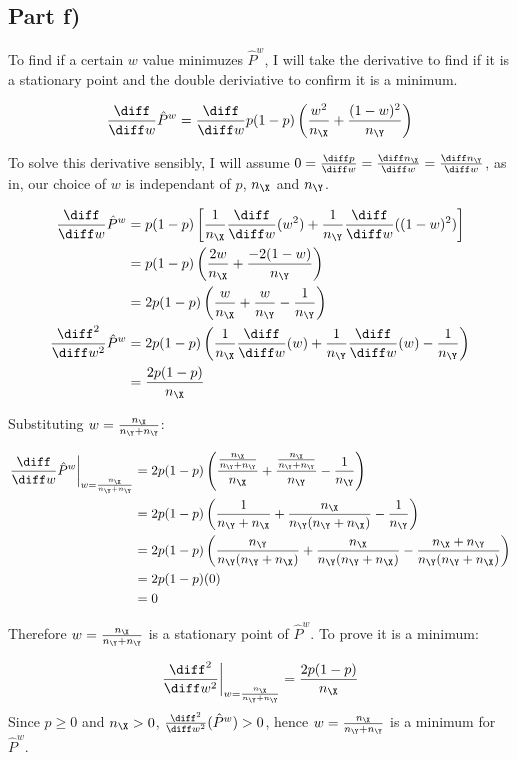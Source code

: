 \subsection{Part f)}
To find if a certain $w$ value minimuzes $\hat{P}^w$, I will take the derivative to find if it is a stationary point and the double deriviative
to confirm it is a minimum.

\[
\frac{\diff}{\diff w} \hat{P}^w = \frac{\diff}{\diff w} p(1-p)\left( \frac{w^2}{n_\X} + \frac{(1-w)^2}{n_\Y} \right)
\]

To solve this derivative sensibly, I will assume $0 = \frac{\diff p}{\diff w} = \frac{\diff n_\X}{\diff w} = \frac{\diff n_\Y}{\diff w}$,
as in, our choice of $w$ is independant of $p$, $n_\X$ and $n_\Y$.

\begin{align*}
\frac{\diff}{\diff w} \hat{P}^w &= p(1-p)\left[ \frac{1}{n_\X} \frac{\diff}{\diff w}(w^2) + \frac{1}{n_\Y} \frac{\diff}{\diff w}((1-w)^2) \right] \\
&= p(1-p) \left( \frac{2w}{n_\X} + \frac{-2(1-w)}{n_\Y} \right) \\
&= 2p(1-p) \left( \frac{w}{n_\X} + \frac{w}{n_\Y} - \frac{1}{n_\Y} \right) \\
\frac{\diff^2}{\diff w^2} \hat{P}^w &= 2p(1-p)\left( \frac{1}{n_\X} \frac{\diff}{\diff w}(w) + \frac{1}{n_\Y}\frac{\diff}{\diff w}(w) - \frac{1}{n_\Y} \right) \\
&= \frac{2p(1 - p)}{n_\X}
\end{align*}

Substituting $w = \frac{n_\X}{n_\Y + n_\Y}$:

\begin{align*}
\left. \frac{\diff}{\diff w} \hat{P}^w \right| _{w = \frac{n_\X}{n_\Y + n_\Y}} &= 2p(1-p)\left(
\frac{\frac{n_\X}{n_\Y + n_\Y}}{n_\X} + \frac{\frac{n_\X}{n_\Y + n_\Y}}{n_\Y} - \frac{1}{n_\Y} \right) \\
&= 2p(1-p)\left( \frac{1}{n_\Y + n_\X} + \frac{n_\X}{n_\Y(n_\Y + n_\X)} - \frac{1}{n_\Y} \right) \\
&= 2p(1-p)\left( \frac{n_\Y}{n_\Y(n_\Y + n_\X)} + \frac{n_\X}{n_\Y(n_\Y + n_\X)} - \frac{n_\X + n_\Y}{n_\Y(n_\Y + n_\X)} \right) \\
&= 2p(1-p)(0) \\
&= 0
\end{align*}

Therefore $w = \frac{n_\X}{n_\Y + n_\Y}$ is a stationary point of $\hat{P}^w$. To prove it is a minimum:

\[
\left. \frac{\diff^2}{\diff w^2} \right| _{w = \frac{n_\X}{n_\Y + n_\Y}} = \frac{2p(1 - p)}{n_\X}
\]
Since $p \geq 0$ and $n_\X > 0$, $\frac{\diff^2}{\diff w^2}(\hat{P}^w) > 0$, hence $w = \frac{n_\X}{n_\Y + n_\Y}$ is a minimum for $\hat{P}^w$.
